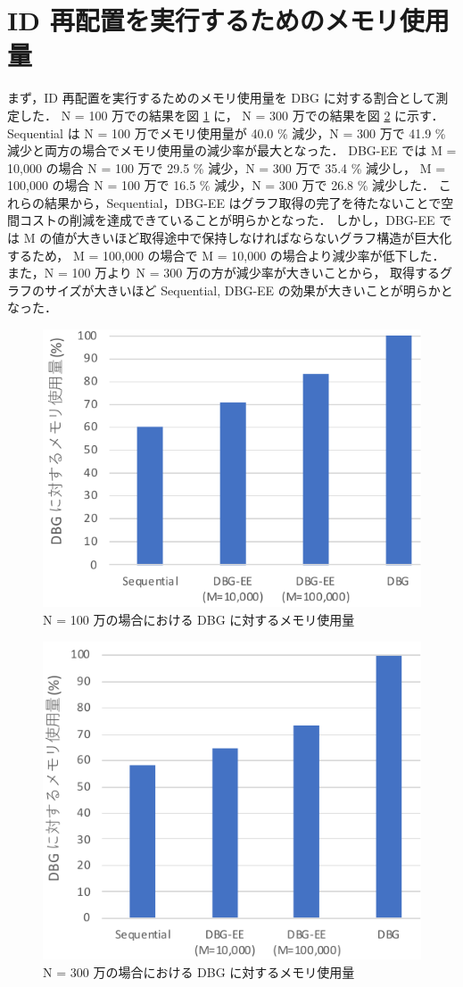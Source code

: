 \section{ID 再配置を実行するためのメモリ使用量}
まず，ID 再配置を実行するためのメモリ使用量を DBG に対する割合として測定した．
N = 100 万での結果を図 \ref{memory_usage_1000000} に，
N = 300 万での結果を図 \ref{memory_usage_3000000} に示す． 
Sequential は N = 100 万でメモリ使用量が 40.0 \% 減少，N = 300 万で 41.9 \% 減少と両方の場合でメモリ使用量の減少率が最大となった．
DBG-EE では M = 10,000 の場合 N = 100 万で 29.5 \% 減少，N = 300 万で 35.4 \% 減少し，
M = 100,000 の場合 N = 100 万で 16.5 \% 減少，N = 300 万で 26.8 \% 減少した．
これらの結果から，Sequential，DBG-EE はグラフ取得の完了を待たないことで空間コストの削減を達成できていることが明らかとなった．
しかし，DBG-EE では M の値が大きいほど取得途中で保持しなければならないグラフ構造が巨大化するため，
M = 100,000 の場合で M = 10,000 の場合より減少率が低下した．
また，N = 100 万より N = 300 万の方が減少率が大きいことから，
取得するグラフのサイズが大きいほど Sequential, DBG-EE の効果が大きいことが明らかとなった．
\begin{figure}[t]
  \centering
  \includegraphics[width=0.8\linewidth]{./figure/memory_usage_10000.pdf}
  \caption{N = 100 万の場合における DBG に対するメモリ使用量}
  \label{memory_usage_1000000}
\end{figure}

\begin{figure}[t]
  \centering
  \includegraphics[width=0.8\linewidth]{./figure/memory_usage_3000000.pdf}
  \caption{N = 300 万の場合における DBG に対するメモリ使用量}
  \label{memory_usage_3000000}
\end{figure}

